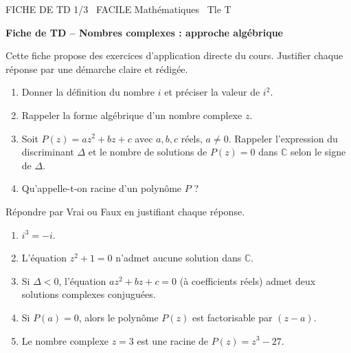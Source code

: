 \documentclass[11pt]{article}
\begin{document}
\begin{tcolorbox}[enhanced,colback=popink,colframe=popink,arc=10pt,boxrule=0pt,left=12pt,right=12pt,top=9pt,bottom=9pt]
{\color{white}\popxbold\small FICHE DE TD 1/3 \textbullet\ FACILE \hfill Mathématiques \textbullet\ Tle T\par}
\end{tcolorbox}
\vspace{4pt}
\textbf{Fiche de TD -- Nombres complexes : approche algébrique}

\smallskip

Cette fiche propose des exercices d'application directe du cours. Justifier chaque réponse par une démarche claire et rédigée.

\begin{exercice}
\begin{enumerate}
\item Donner la définition du nombre $i$ et préciser la valeur de $i^2$.
\item Rappeler la forme algébrique d'un nombre complexe $z$.
\item Soit $P(z)=az^2+bz+c$ avec $a,b,c$ réels, $a\neq 0$. Rappeler l'expression du discriminant $\Delta$ et le nombre de solutions de $P(z)=0$ dans $\mathbb{C}$ selon le signe de $\Delta$.
\item Qu'appelle-t-on racine d'un polynôme $P$ ?
\end{enumerate}
\end{exercice}

\begin{exercice}
Répondre par Vrai ou Faux en justifiant chaque réponse.
\begin{enumerate}
\item $i^3=-i$.
\item L'équation $z^2+1=0$ n'admet aucune solution dans $\mathbb{C}$.
\item Si $\Delta<0$, l'équation $az^2+bz+c=0$ (à coefficients réels) admet deux solutions complexes conjuguées.
\item Si $P(a)=0$, alors le polynôme $P(z)$ est factorisable par $(z-a)$.
\item Le nombre complexe $z=3$ est une racine de $P(z)=z^3-27$.
\end{enumerate}
\end{exercice}
\end{document}
